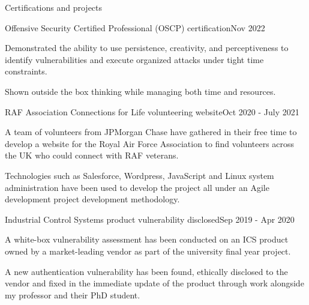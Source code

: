 \documentclass{resume} %
\begin{document}
\newpage

\begin{rSection}{Certifications and projects}

\begin{rSubsection}{Offensive Security Certified Professional (OSCP) certification}{Nov 2022}{}{}
\item Demonstrated the ability to use persistence, creativity, and perceptiveness to identify vulnerabilities and execute organized attacks under tight time constraints. \item Shown outside the box thinking while managing both time and resources.
\end{rSubsection}

\begin{rSubsection}{RAF Association Connections for Life volunteering website}{Oct 2020 - July 2021}{}{}
\item A team of volunteers from JPMorgan Chase have gathered in their free time to develop a website for the Royal Air Force Association to find volunteers across the UK who could connect with RAF veterans. 

\item Technologies such as Salesforce, Wordpress, JavaScript and Linux system administration have been used to develop the project all under an Agile development project development methodology.
\end{rSubsection}

\begin{rSubsection}{Industrial Control Systems product vulnerability disclosed}{Sep 2019 - Apr 2020}{}{}
\item A white-box vulnerability assessment has been conducted on an ICS product owned by a market-leading vendor as part of the university final year project. 

\item A new authentication vulnerability has been found, ethically disclosed to the vendor and fixed in the immediate update of the product through work alongside my professor and their PhD student. 
\end{rSubsection}


\end{rSection}
\end{document}
